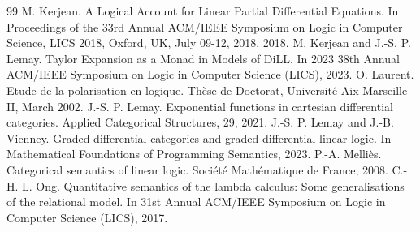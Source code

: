 \documentclass[10pt,a4paper]{amsart}
\begin{document}
\begin{thebibliography}{99}
 M. Kerjean. A Logical Account for Linear Partial Differential Equations. In Proceedings of the 33rd Annual ACM/IEEE Symposium on Logic in Computer Science, LICS 2018, Oxford, UK, July 09-12, 2018, 2018.
 M. Kerjean and J.-S. P. Lemay. Taylor Expansion as a Monad in Models of DiLL. In 2023 38th Annual ACM/IEEE Symposium on Logic in Computer Science (LICS), 2023.
 O. Laurent. Etude de la polarisation en logique. Thèse de Doctorat, Université Aix-Marseille II, March 2002.
 J.-S. P. Lemay. Exponential functions in cartesian differential categories. Applied Categorical Structures, 29, 2021.
 J.-S. P. Lemay and J.-B. Vienney. Graded differential categories and graded differential linear logic. In Mathematical Foundations of Programming Semantics, 2023.
 P.-A. Melliès. Categorical semantics of linear logic. Société Mathématique de France, 2008.
 C.-H. L. Ong. Quantitative semantics of the lambda calculus: Some generalisations of the relational model. In 31st Annual ACM/IEEE Symposium on Logic in Computer Science (LICS), 2017.
\end{thebibliography}
\end{document}
